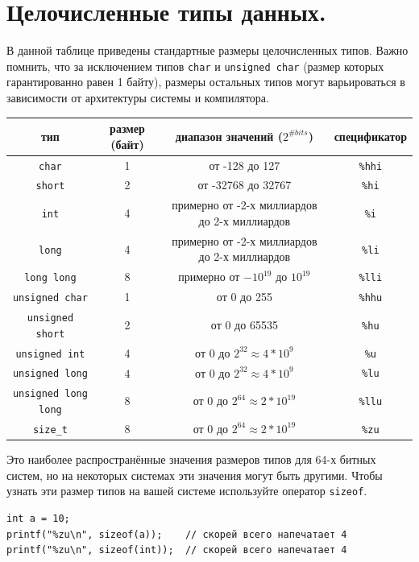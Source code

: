 \documentclass{article}
\begin{document}
\section*{Целочисленные типы данных.}
В данной таблице приведены стандартные размеры целочисленных типов. Важно помнить, что за исключением типов \texttt{char} и \texttt{unsigned char} (размер которых гарантированно равен 1 байту), размеры остальных типов могут варьироваться в зависимости от архитектуры системы и компилятора.
\begin{center}
\begin{tabular}{ c c c c }
 тип & размер (байт) & диапазон значений ($2^{\# bits}$) & спецификатор \\ \hline
 \texttt{char} & 1 & от -128 до 127 & \texttt{\%hhi} \\ 
 \texttt{short} & 2 & от -32768 до 32767 & \texttt{\%hi}  \\  
 \texttt{int} & 4 & примерно от -2-х миллиардов до 2-х миллиардов & \texttt{\%i}  \\  
 \texttt{long} & 4 & примерно от -2-х миллиардов до 2-х миллиардов & \texttt{\%li}  \\  
 \texttt{long long} & 8 & примерно от $-10^{19}$ до $10^{19}$ & \texttt{\%lli}  \\  
 \texttt{unsigned char} & 1 & от 0 до 255 & \texttt{\%hhu} \\ 
 \texttt{unsigned short} & 2 & от 0 до 65535 & \texttt{\%hu}  \\  
 \texttt{unsigned int} & 4 & от 0 до $2^{32} \approx 4*10^{9}$ & \texttt{\%u}  \\  
 \texttt{unsigned long} & 4 & от 0 до $2^{32} \approx 4*10^{9}$ & \texttt{\%lu}  \\  
 \texttt{unsigned long long} & 8 & от 0 до $2^{64} \approx 2*10^{19}$  & \texttt{\%llu}  \\  
 \texttt{size\_t} & 8 & от 0 до $2^{64} \approx 2*10^{19}$ & \texttt{\%zu} \\ \hline
\end{tabular}
\end{center}
Это наиболее распространённые значения размеров типов для 64-х битных систем, но на некоторых системах эти значения могут быть другими.
Чтобы узнать эти размер типов на вашей системе используйте оператор \texttt{sizeof}. 
\begin{lstlisting}
int a = 10;
printf("%zu\n", sizeof(a));    // скорей всего напечатает 4
printf("%zu\n", sizeof(int));  // скорей всего напечатает 4
\end{lstlisting}
\end{document}
